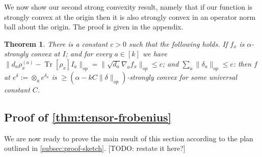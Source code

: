 \documentclass[aos]{imsart}
\newtheorem{theorem}{Theorem}[section]
\theoremstyle{definition}
\numberwithin{equation}{section}
\DeclareMathOperator{\tr}{Tr}
\newcommand{\samp}{x}
\newcommand{\CF}[1]{{\color{purple}[CF: #1]}}
\newcommand{\TODO}[1]{{\color{blue}[TODO: #1]}}
\begin{document}



We now show our second strong convexity result, namely that if our function is strongly convex at the origin then it is also strongly convex in an operator norm ball about the origin. The proof is given in the appendix.


\begin{theorem} \label{convexRobustness}
There is a constant $c>0$ such that the following holds. If $f_{\samp}$ is $\alpha$-strongly convex at $I$; and for every $a \in [k]$ we have $\|d_{a} \rho_{\samp}^{(a)} - \tr[\rho_{\samp}] I_{a}\|_{op} = \|\sqrt{d_{a}} \nabla_{a} f_{\samp}\|_{op} \leq c$; and $\sum_{a} \|\delta_{a}\|_{op} \leq c$: then $f$ at $e^{\delta} := \otimes_{a} e^{\delta_{a}}$ is $\geq (\alpha - k C \|\delta\|_{op})$-strongly convex for some universal constant $C$.
\end{theorem}

\subsection{Proof of \cref{thm:tensor-frobenius}}
We are now ready to prove the main result of this section according to the plan outlined in \cref{subsec:proof-sketch}.
\TODO{restate it here?}
\end{document}
